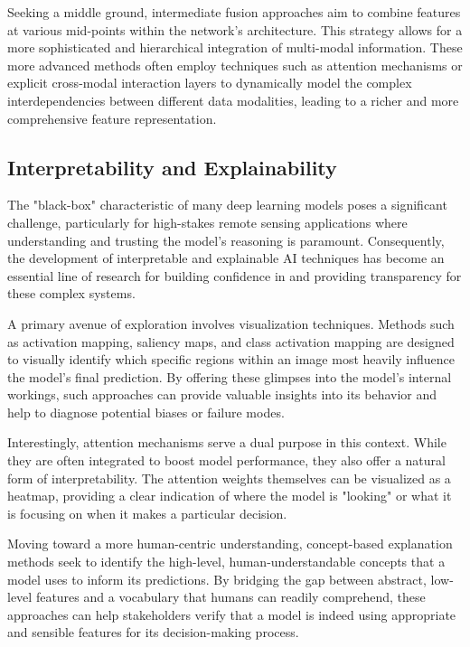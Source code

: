 \documentclass[12pt,a4paper]{article}
\begin{document}
Seeking a middle ground, intermediate fusion approaches aim to combine features at various mid-points within the network's architecture. This strategy allows for a more sophisticated and hierarchical integration of multi-modal information. These more advanced methods often employ techniques such as attention mechanisms or explicit cross-modal interaction layers to dynamically model the complex interdependencies between different data modalities, leading to a richer and more comprehensive feature representation.

\subsection{Interpretability and Explainability}
The "black-box" characteristic of many deep learning models poses a significant challenge, particularly for high-stakes remote sensing applications where understanding and trusting the model's reasoning is paramount. Consequently, the development of interpretable and explainable AI techniques has become an essential line of research for building confidence in and providing transparency for these complex systems.

A primary avenue of exploration involves visualization techniques. Methods such as activation mapping, saliency maps, and class activation mapping are designed to visually identify which specific regions within an image most heavily influence the model's final prediction. By offering these glimpses into the model's internal workings, such approaches can provide valuable insights into its behavior and help to diagnose potential biases or failure modes.

Interestingly, attention mechanisms serve a dual purpose in this context. While they are often integrated to boost model performance, they also offer a natural form of interpretability. The attention weights themselves can be visualized as a heatmap, providing a clear indication of where the model is "looking" or what it is focusing on when it makes a particular decision.

Moving toward a more human-centric understanding, concept-based explanation methods seek to identify the high-level, human-understandable concepts that a model uses to inform its predictions. By bridging the gap between abstract, low-level features and a vocabulary that humans can readily comprehend, these approaches can help stakeholders verify that a model is indeed using appropriate and sensible features for its decision-making process.
\end{document}
